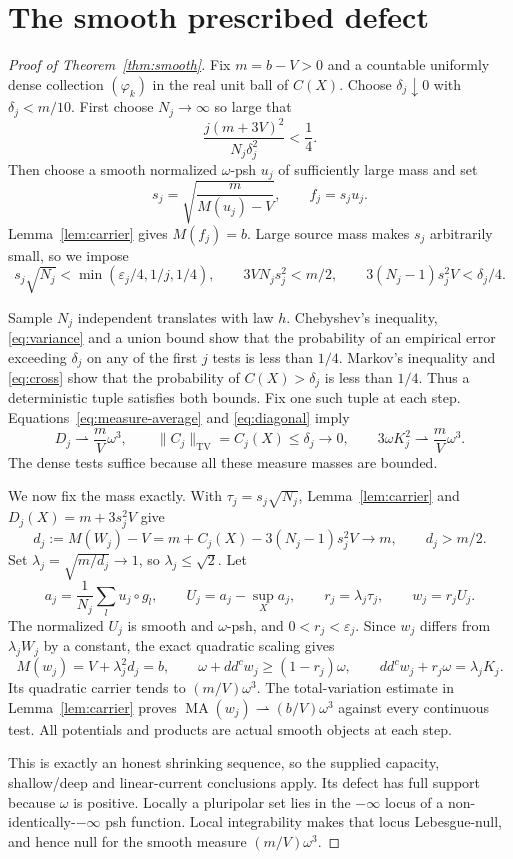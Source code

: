 \documentclass[11pt]{article}
\newcommand{\ddc}{dd^c}
\newcommand{\MA}{\operatorname{MA}}
\newcommand{\TV}{\mathrm{TV}}
\begin{document}
\section{The smooth prescribed defect}
\begin{proof}[Proof of Theorem~\ref{thm:smooth}]
Fix $m=b-V>0$ and a countable uniformly dense collection
$(\varphi_k)$ in the real unit ball of $C(X)$. Choose
$\delta_j\downarrow0$ with $\delta_j<m/10$. First choose
$N_j\to\infty$ so large that
\[
 \frac{j(m+3V)^2}{N_j\delta_j^2}<\frac14.
\]
Then choose a smooth normalized $\omega$-psh $u_j$ of sufficiently
large mass and set
\[
 s_j=\sqrt{\frac{m}{M(u_j)-V}},\qquad f_j=s_ju_j.
\]
Lemma~\ref{lem:carrier} gives $M(f_j)=b$. Large source mass makes
$s_j$ arbitrarily small, so we impose
\[
 s_j\sqrt{N_j}<\min(\varepsilon_j/4,1/j,1/4),\qquad
 3VN_js_j^2<m/2,\qquad
 3(N_j-1)s_j^2V<\delta_j/4.
\]

Sample $N_j$ independent translates with law $h$. Chebyshev's
inequality, \eqref{eq:variance} and a union bound show that the
probability of an empirical error exceeding $\delta_j$ on any of
the first $j$ tests is less than $1/4$. Markov's inequality and
\eqref{eq:cross} show that the probability of $C(X)>\delta_j$ is
less than $1/4$. Thus a deterministic tuple satisfies both bounds.
Fix one such tuple at each step. Equations~\eqref{eq:measure-average}
and \eqref{eq:diagonal} imply
\[
 D_j\rightharpoonup\frac mV\omega^3,\qquad
 \|C_j\|_{\TV}=C_j(X)\leq\delta_j\longrightarrow0,
 \qquad 3\omega K_j^2\rightharpoonup\frac mV\omega^3.
\]
The dense tests suffice because all these measure masses are bounded.

We now fix the mass exactly. With $\tau_j=s_j\sqrt{N_j}$,
Lemma~\ref{lem:carrier} and $D_j(X)=m+3s_j^2V$ give
\[
 d_j:=M(W_j)-V=m+C_j(X)-3(N_j-1)s_j^2V\longrightarrow m,
 \qquad d_j>m/2.
\]
Set $\lambda_j=\sqrt{m/d_j}\to1$, so $\lambda_j\leq\sqrt2$.
Let
\[
 a_j=\frac1{N_j}\sum_lu_j\circ g_l,\qquad
 U_j=a_j-\sup_Xa_j,\qquad r_j=\lambda_j\tau_j,
 \qquad w_j=r_jU_j.
\]
The normalized $U_j$ is smooth and $\omega$-psh, and
$0<r_j<\varepsilon_j$. Since $w_j$ differs from
$\lambda_jW_j$ by a constant, the exact quadratic scaling gives
\[
 M(w_j)=V+\lambda_j^2d_j=b,\qquad
 \omega+\ddc w_j\geq(1-r_j)\omega,
 \qquad \ddc w_j+r_j\omega=\lambda_jK_j.
\]
Its quadratic carrier tends to $(m/V)\omega^3$. The total-variation
estimate in Lemma~\ref{lem:carrier} proves
$\MA(w_j)\rightharpoonup(b/V)\omega^3$ against every continuous test.
All potentials and products are actual smooth objects at each step.

This is exactly an honest shrinking sequence, so the supplied capacity,
shallow/deep and linear-current conclusions apply. Its defect has full
support because $\omega$ is positive. Locally a pluripolar set lies in
the $-\infty$ locus of a non-identically-$-\infty$ psh function.
Local integrability \cite[I.4.17 and I.5.3]{Demailly} makes that
locus Lebesgue-null, and hence null
for the smooth measure $(m/V)\omega^3$.
\end{proof}
\end{document}
